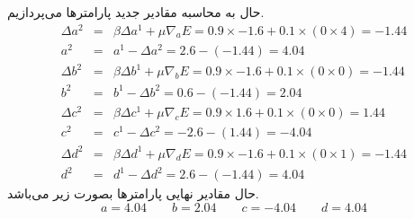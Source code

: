 \documentclass[12pt]{article}
\begin{document}
		حال به محاسبه مقادیر جدید پارامترها می‌پردازیم.
		\begin{eqnarray*}
			\Delta a^{2} &=& \beta \Delta a^{1} + \mu \nabla_{a}E = 0.9\times-1.6 +
			0.1\times (0\times4) = -1.44\\
			a^{2} &=& a^{1} - \Delta a^{2} = 2.6 - (-1.44) = 4.04\\
			\Delta b^{2} &=& \beta \Delta b^{1} + \mu \nabla_{b}E = 0.9\times-1.6+
			0.1\times (0\times0) = -1.44\\
			b^{2} &=& b^{1} - \Delta b^{2} = 0.6 -(-1.44) = 2.04\\
			\Delta c^{2} &=& \beta \Delta c^{1} + \mu \nabla_{c}E = 0.9\times1.6+
			0.1\times (0\times0) = 1.44\\
			c^{2} &=& c^{1} - \Delta c^{2} = -2.6 - (1.44) = -4.04\\
			\Delta d^{2} &=& \beta \Delta d^{1} + \mu \nabla_{d}E = 0.9\times-1.6+
			0.1\times(0\times1) = -1.44\\
			d^{2} &=& d^{1} - \Delta d^{2} = 2.6 - (-1.44) = 4.04
		\end{eqnarray*}
		حال مقادیر نهایی پارامترها بصورت زیر می‌باشد.
		$$a=4.04 \qquad b=2.04\qquad c=-4.04\qquad d=4.04$$
\end{document}
